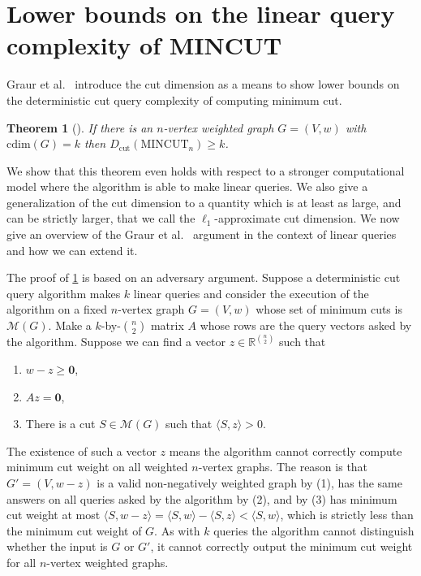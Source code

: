\documentclass[10pt,a4paper]{article}
\newcommand{\R}{\mathbb{R}}
\newcommand{\M}{\mathcal{M}}
\newcommand{\MINCUT}{\mathrm{MINCUT}}
\newcommand{\cut}{\mathrm{cut}}
\newcommand{\cd}{\mathrm{cdim}}
\newcommand{\braket}[2]{\langle#1, #2\rangle}
\newcommand{\1}{\mathbf{1}}
\newtheorem{theorem}{Theorem}
\theoremstyle{definition}
\begin{document}
%

\section{Lower bounds on the linear query complexity of MINCUT}\label{sec:min-query}
Graur et al.~\cite{GPRW20} introduce the cut dimension as a means to show lower bounds on the
deterministic cut query complexity of computing minimum cut.

\begin{theorem}[\cite{GPRW20}]
\label{thm:graur_lower}
If there is an $n$-vertex {weighted graph $G = (V,w)$} with $\cd(G) = k$ then $D_\cut(\MINCUT_n) \ge k$.
\end{theorem}

We show that this theorem even holds with respect to a stronger computational model where the algorithm is able to
make linear queries.  We also give a generalization of the cut dimension to a quantity which is at least as large,
and can be strictly larger, that we call the $\ell_1$-approximate cut dimension.  We now give an overview of the Graur et al.\  \cite{GPRW20}
argument in the context of linear queries and how we can extend it.

The proof of \cref{thm:graur_lower} is based on an adversary argument.  Suppose a deterministic cut query algorithm makes $k$ linear queries
and consider the execution of the algorithm on a fixed $n$-vertex graph $G = (V,w)$ whose set of minimum cuts is $\M(G)$.
Make a $k$-by-$\binom{n}{2}$ matrix ${A}$ whose rows are the query vectors asked by the algorithm. Suppose we can find a vector
${z} \in \R^{\binom{n}{2}}$ such that
\begin{enumerate}
  \item $w-{z} \ge \mathbf{0}$,
  \item ${A}{z} = \mathbf{0}$,
  \item There is a cut $S \in \M(G)$ such that $\braket{S}{z} > 0$.
\end{enumerate}
The existence of such a vector $z$ means the algorithm cannot correctly compute minimum cut
weight on all weighted $n$-vertex graphs.  The reason is that $G' = (V,w-z)$
is a valid non-negatively weighted graph by (1), has the same answers on all queries asked by the algorithm by (2),
and by (3) has minimum cut weight at most $\braket{S}{w-z} = \braket{S}{w} - \braket{S}{z} < \braket{S}{w}$,
which is strictly less than the minimum cut weight of $G$. As with $k$ queries the algorithm cannot distinguish whether the input is $G$ or $G'$, it cannot correctly output the minimum cut weight for all $n$-vertex weighted graphs.
\end{document}
